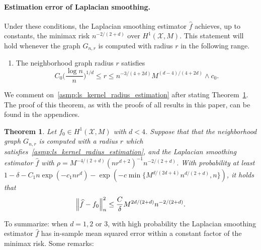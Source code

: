 \documentclass[twoside]{article}
\newcommand{\1}{\mathbf{1}}
\newcommand{\Xset}{\mathcal{X}}
\newcommand{\wh}[1]{\widehat{#1}}
\newtheorem{theorem}{Theorem}
\theoremstyle{definition}
\theoremstyle{remark}
\begin{document}
\paragraph{Estimation error of Laplacian smoothing.} 
Under these conditions, the Laplacian smoothing estimator $\wh{f}$ achieves, up to constants, the minimax risk $n^{-2/(2 + d)}$ over $H^1(\Xset,M)$. This statement will hold whenever the graph $G_{n,r}$ is computed with radius $r$ in the following range.
\begin{enumerate}[label=(R\arabic*)]
	\setcounter{enumi}{0}
	\item 
	\label{asmp:ls_kernel_radius_estimation}
	The neighborhood graph radius $r$ satisfies
	\begin{equation*}
	C_0\biggl(\frac{\log n}{n}\biggr)^{1/d} \leq r \leq n^{-3/(4 + 2d)} M^{(d - 4)/(4 + 2d)} \wedge c_0.
	\end{equation*}
\end{enumerate}
We comment on~\ref{asmp:ls_kernel_radius_estimation} after stating Theorem~\ref{thm:laplacian_smoothing_estimation1}. The proof of this theorem, as with the proofs of all results in this paper, can be found in the appendices.
\begin{theorem}
	\label{thm:laplacian_smoothing_estimation1}
	Let $f_0 \in H^1(\Xset,M)$ with $d < 4$. Suppose that that the neighborhood graph $G_{n,r}$ is computed with a radius $r$ which satisfies~\ref{asmp:ls_kernel_radius_estimation},  and the Laplacian smoothing estimator $\wh{f}$ with $\rho = M^{-4/(2 + d)} (nr^{d + 2})^{-1} n^{-2/(2 + d)}$. With probability at least $1 - \delta -  C_1n\exp(-c_1nr^d) - \exp(-c \min\{M^{d/(2d + 4)} n^{d/(2+d)},n\})$, it holds that
	\begin{equation}
	\label{eqn:laplacian_smoothing_estimation1}
	\Bigl\|\wh{f} - f_0\Bigr\|_n^2 \leq \frac{C}{\delta} M^{2d/(2 + d)} n^{-2/(2 + d)}.
	\end{equation}
\end{theorem}
To summarize: when $d = 1,2$ or $3$, with high probability the Laplacian smoothing estimator $\wh{f}$ has in-sample mean squared error within a constant factor of the minimax risk. Some remarks:
\end{document}
